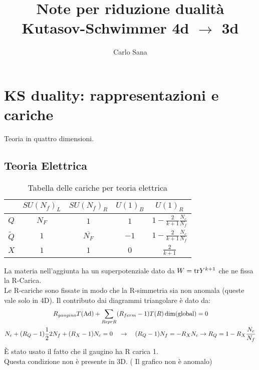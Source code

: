 \documentclass[a4paper,12pt]{article}
\title{Note per riduzione dualità Kutasov-Schwimmer 4d $\rightarrow$ 3d}
\author{Carlo Sana}
\begin{document}
\maketitle
\newpage
\section*{KS duality: rappresentazioni e cariche}
Teoria in quattro dimensioni.
\subsection*{Teoria Elettrica}
\begin{center}
\begin{table}[h!]
\begin{tabular}{c c c c c }
 & $SU(N_f)_L$  &$SU(N_f)_R $  & $U(1)_B$ &  $U(1)_R$ \\
\hline
$Q$ & $N_F$ & $1$   &  $1$  & $ 1 - \frac{2}{k+1} \frac{N_c}{N_f}$  \\
$\tilde{Q}$  &  $1$ & $\overline{ N_F}$   & $-1$   &  $ 1 - \frac{2}{k+1} \frac{N_c}{N_f} $   \\
$X$ & $1$   &$ 1$    &$ 0$   &  $\frac{2}{k+1}$ \\
\end{tabular}
\centering
\caption{Tabella delle cariche per teoria elettrica}
\label{table:charge_table_el_ks_4d}
\end{table}
\end{center}
La materia nell'aggiunta ha un superpotenziale dato da $ W = \hbox{tr} Y^{k+1}$ che ne fissa la R-Carica.\\
Le R-cariche sono fissate in modo che la R-simmetria sia non anomala (queste vale solo in 4D).
Il contributo dai diagrammi triangolare è dato da:
\begin{align*}
R_{gaugino} T (\hbox{Ad}) + \sum_{Repr R} (& R_{ferm} - 1)  T(R) \, \hbox{dim}( \hbox{global})  = 0 \\
N_c + (R_Q -1) \frac{1}{2} 2 N_f + (R_X - 1 ) N_c = 0 \quad & \rightarrow \quad (R_Q - 1 ) N_f = - R_X N_c \rightarrow R_Q = 1 - R_X \frac{N_c}{N_f}
\end{align*}
È stato usato il fatto che il gaugino ha R carica 1. \\
Questa condizione non è presente in 3D. ( Il grafico non è anomalo)
\end{document}
